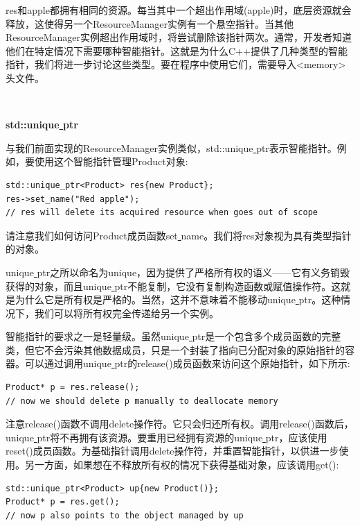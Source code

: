 res和apple都拥有相同的资源。每当其中一个超出作用域(apple)时，底层资源就会释放，这使得另一个ResourceManager实例有一个悬空指针。当其他ResourceManager实例超出作用域时，将尝试删除该指针两次。通常，开发者知道他们在特定情况下需要哪种智能指针。这就是为什么C++提供了几种类型的智能指针，我们将进一步讨论这些类型。要在程序中使用它们，需要导入<memory>头文件。\par

\noindent\textbf{}\ \par
\textbf{std::unique\underline{ }ptr} \ \par
与我们前面实现的ResourceManager实例类似，std::unique\underline{ }ptr表示智能指针。例如，要使用这个智能指针管理Product对象: \par

\begin{lstlisting}[caption={}]
std::unique_ptr<Product> res{new Product};
res->set_name("Red apple");
// res will delete its acquired resource when goes out of scope
\end{lstlisting}

请注意我们如何访问Product成员函数set\underline{ }name。我们将res对象视为具有类型指针的对象。\par
unique\underline{ }ptr之所以命名为unique，因为提供了严格所有权的语义——它有义务销毁获得的对象，而且unique\underline{ }ptr不能复制，它没有复制构造函数或赋值操作符。这就是为什么它是所有权是严格的。当然，这并不意味着不能移动unique\underline{ }ptr。这种情况下，我们可以将所有权完全传递给另一个实例。 \par
智能指针的要求之一是轻量级。虽然unique\underline{ }ptr是一个包含多个成员函数的完整类，但它不会污染其他数据成员，只是一个封装了指向已分配对象的原始指针的容器。可以通过调用unique\underline{ }ptr的release()成员函数来访问这个原始指针，如下所示: \par

\begin{lstlisting}[caption={}]
Product* p = res.release();
// now we should delete p manually to deallocate memory
\end{lstlisting}

注意release()函数不调用delete操作符。它只会归还所有权。调用release()函数后，unique\underline{ }ptr将不再拥有该资源。要重用已经拥有资源的unique\underline{ }ptr，应该使用reset()成员函数。为基础指针调用delete操作符，并重置智能指针，以供进一步使用。另一方面，如果想在不释放所有权的情况下获得基础对象，应该调用get(): \par

\begin{lstlisting}[caption={}]
std::unique_ptr<Product> up{new Product()};
Product* p = res.get();
// now p also points to the object managed by up
\end{lstlisting}

